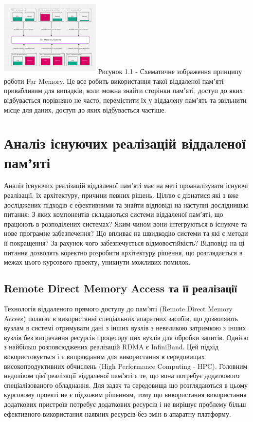 \documentclass[14pt]{article}
\begin{document}
\includegraphics[width=5cm, height=4cm]{image1.png}
Рисунок 1.1 - Схематичне зображення принципу роботи Far Memory.
Це все робить використання такої віддаленої памʼяті привабливим для випадків, коли можна знайти сторінки памʼяті, доступ до яких відбувається порівняно не часто, перемістити їх у віддалену памʼять та звільнити місце для даних, доступ до яких відбувається частіше.

\section{Аналіз існуючих реалізацій віддаленої памʼяті}

Аналіз існуючих реалізацій віддаленої памʼяті має на меті проаналізувати існуючі реалізації, їх архітектуру, причини певних рішень. Ціллю є дізнатися які з вже досліджених підходів є ефективними та знайти відповіді на наступні дослідницькі питання:
З яких компонентів складаються системи віддаленої памʼяті, що працюють в розподілених системах?
Яким чином вони інтегруються в існуюче та нове програмне забезпечення?
Що впливає на швидкодію системи та які є методи її покращення?
За рахунок чого забезпечується відмовостійкість?
Відповіді на ці питання дозволять коректно розробити архітектуру рішення, що розглядається в межах цього курсового проекту, уникнути можливих помилок.

\subsection {Remote Direct Memory Access та її реалізації}

Технологія віддаленого прямого доступу до памʼяті (Remote Direct Memory Access) полягає в використанні спеціальних апаратних засобів, що дозволяють вузлам в системі отримувати дані з інших вузлів з невеликою затримкою з інших вузлів без витрачання ресурсів процесору цих вузлів для обробки запитів. Однією з найбільш розповсюджених реалізацій RDMA є InfiniBand. Цей підхід використовується і є виправданим для використання в середовищах високопродуктивних обчислень (High Performance Computing - HPC). Головним недоліком цієї реалізації віддаленої памʼяті є те, що вона потребує додаткового спеціалізованого обладнання. Для задач та середовища що розглядаються в цьому курсовому проекті не є підхожим рішенням, тому що використання використання додаткових пристроїв потребує додаткових ресурсів і не вирішує проблему більш ефективного використання наявних ресурсів без змін в апаратну платформу.
\end{document}
